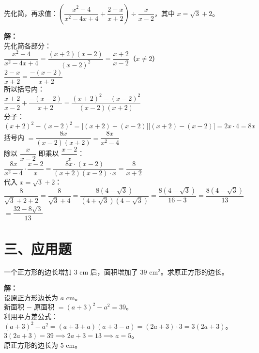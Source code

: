 \documentclass[12pt, a4paper]{ctexart}
\begin{document}
\begin{examplebox}
先化简，再求值：$\left(\dfrac{x^2-4}{x^2-4x+4} + \dfrac{2-x}{x+2}\right) \div \dfrac{x}{x-2}$，其中 $x = \sqrt{3} + 2$。
\end{examplebox}

\textbf{解：}\\[3pt]
先化简各部分：\\
$\dfrac{x^2-4}{x^2-4x+4} = \dfrac{(x+2)(x-2)}{(x-2)^2} = \dfrac{x+2}{x-2}$\quad（$x \neq 2$）\\[6pt]
$\dfrac{2-x}{x+2} = \dfrac{-(x-2)}{x+2}$\\[6pt]
所以括号内：\\
$\dfrac{x+2}{x-2} + \dfrac{-(x-2)}{x+2} = \dfrac{(x+2)^2 - (x-2)^2}{(x-2)(x+2)}$\\[4pt]
分子：$(x+2)^2-(x-2)^2 = \big[(x+2)+(x-2)\big]\big[(x+2)-(x-2)\big] = 2x \cdot 4 = 8x$\\[4pt]
括号内 $= \dfrac{8x}{(x-2)(x+2)} = \dfrac{8x}{x^2-4}$\\[6pt]
除以 $\dfrac{x}{x-2}$ 即乘以 $\dfrac{x-2}{x}$：\\
$\dfrac{8x}{x^2-4} \cdot \dfrac{x-2}{x} = \dfrac{8x \cdot (x-2)}{(x+2)(x-2) \cdot x} = \dfrac{8}{x+2}$\\[6pt]
代入 $x = \sqrt{3}+2$：\\
$\dfrac{8}{\sqrt{3}+2+2} = \dfrac{8}{\sqrt{3}+4} = \dfrac{8(4-\sqrt{3})}{(4+\sqrt{3})(4-\sqrt{3})} = \dfrac{8(4-\sqrt{3})}{16-3} = \dfrac{8(4-\sqrt{3})}{13}$\\[4pt]
$= \boxed{\dfrac{32-8\sqrt{3}}{13}}$


\section*{\textcolor{apppurple}{三、应用题}}

\begin{appbox}[【应用 1】几何中的因式分解]
一个正方形的边长增加 $3$ cm 后，面积增加了 $39$ cm$^2$。求原正方形的边长。
\end{appbox}

\textbf{解：}\\[3pt]
设原正方形边长为 $a$ cm。\\
新面积 $-$ 原面积 $= (a+3)^2 - a^2 = 39$。\\[3pt]
利用平方差公式：$(a+3)^2 - a^2 = (a+3+a)(a+3-a) = (2a+3) \cdot 3 = 3(2a+3)$。\\[3pt]
$3(2a+3) = 39 \implies 2a+3 = 13 \implies a = 5$。\\[3pt]
原正方形的边长为 $\boxed{5}$ cm。
\end{document}
